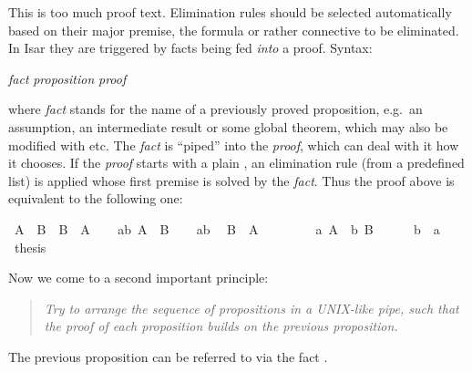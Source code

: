 \begin{isabellebody}
\begin{isamarkuptext}
This is too much proof text. Elimination rules should be selected
automatically based on their major premise, the formula or rather connective
to be eliminated. In Isar they are triggered by facts being fed
\emph{into} a proof. Syntax:
\begin{center}
 \emph{fact}  \emph{proposition} \emph{proof}
\end{center}
where \emph{fact} stands for the name of a previously proved
proposition, e.g.\ an assumption, an intermediate result or some global
theorem, which may also be modified with  etc.
The \emph{fact} is ``piped'' into the \emph{proof}, which can deal with it
how it chooses. If the \emph{proof} starts with a plain ,
an elimination rule (from a predefined list) is applied
whose first premise is solved by the \emph{fact}. Thus the proof above
is equivalent to the following one:%
\end{isamarkuptext}%
\isamarkuptrue%
\isamarkupfalse%
\ {\isachardoublequoteopen}A\ {\isasymand}\ B\ {\isasymlongrightarrow}\ B\ {\isasymand}\ A{\isachardoublequoteclose}\isanewline
%
\isadelimproof
%
\endisadelimproof
%
\isatagproof
{}\isamarkupfalse%
\isanewline
\ \ \isamarkupfalse%
\ ab{\isacharcolon}\ {\isachardoublequoteopen}A\ {\isasymand}\ B{\isachardoublequoteclose}\isanewline
\ \ \isamarkupfalse%
\ ab\ \isamarkupfalse%
\ {\isachardoublequoteopen}B\ {\isasymand}\ A{\isachardoublequoteclose}\isanewline
\ \ \isamarkupfalse%
\isanewline
\ \ \ \ \isamarkupfalse%
\ a{\isacharcolon}\ {\isachardoublequoteopen}A{\isachardoublequoteclose}\ \ b{\isacharcolon}\ {\isachardoublequoteopen}B{\isachardoublequoteclose}\isanewline
\ \ \ \ \isamarkupfalse%
\ b\ \ a\ \isamarkupfalse%
\ {\isacharquery}thesis\ \isacommand{{\isachardot}{\isachardot}}\isamarkupfalse%
\isanewline
\ \ \isamarkupfalse%
\isanewline
{}\isamarkupfalse%
%
\endisatagproof
{\isafoldproof}%
%
\isadelimproof
%
\endisadelimproof
%
\begin{isamarkuptext}%
Now we come to a second important principle:
\begin{quote}\em
Try to arrange the sequence of propositions in a UNIX-like pipe,
such that the proof of each proposition builds on the previous proposition.
\end{quote}
The previous proposition can be referred to via the fact .

\end{isamarkuptext}
\end{isabellebody}
